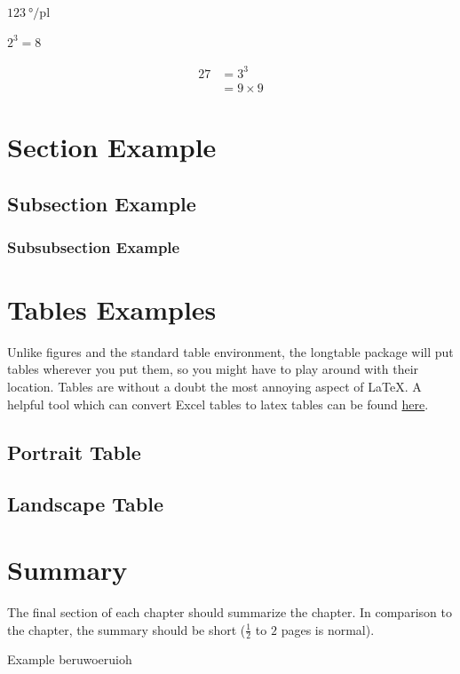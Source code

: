 $\SI{123}{\degree\per\pico\litre}$

    \begin{math}
        2^3=8
    \end{math}
    
    \begin{align}
        27 &= 3^3 \\
        &= 9 \times 9
    \end{align}
\section{Section Example}\label{sec:section_Example}
\subsection{Subsection Example}
\subsubsection{Subsubsection Example}
    
    
\section{Tables Examples}
Unlike figures and the standard table environment, the longtable package will put tables wherever you put them, so you might have to play around with their location. Tables are without a doubt the most annoying aspect of \LaTeX. A helpful tool which can convert Excel tables to latex tables can be found \href{https://github.com/krlmlr/Excel2LaTeX}{here}.

\newpage %
\subsection{Portrait Table}

\subsection{Landscape Table}

\section{Summary}
\label{s:Background-Summary}

The final section of each chapter should summarize the chapter. In comparison to the chapter, the summary should be short ($\frac{1}{2}$ to $2$ pages is normal).

Example beruwoeruioh \cite{HerbertF:1965:Dune} \citeauthor{HerbertB:2002:Butlerian-Jihad} \citeyear{HerbertB:2000:Harkonnen}


